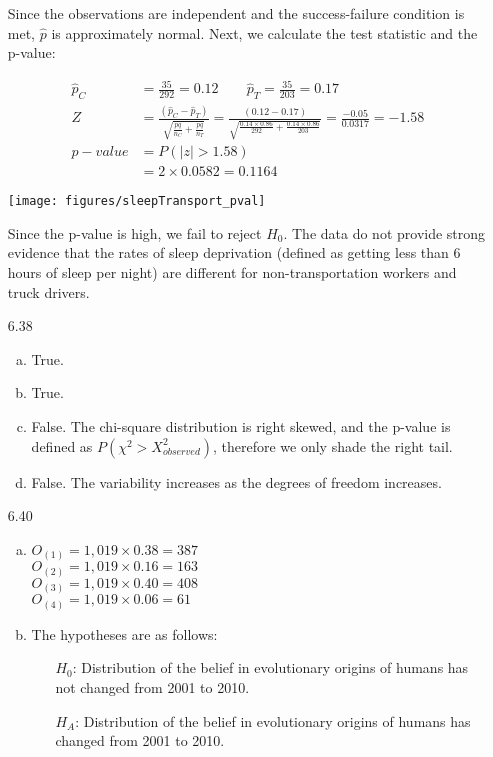 \documentclass[11pt]{article}
\begin{document}
\begin{enumerate}
Since the observations are independent and the success-failure condition is met, $\hat{p}$ is approximately normal. Next, we calculate the test statistic and the p-value:

\begin{minipage}{0.6\textwidth}
\begin{align*}
\hat{p}_C &= \frac{35}{292} = 0.12 \qquad \hat{p}_T = \frac{35}{203} = 0.17 \\
Z &= \frac{(\hat{p}_C - \hat{p}_T)}{\sqrt{\frac{\hat{p} \hat{q}}{n_C} + \frac{\hat{p} \hat{q}}{n_T}}} = \frac{(0.12 - 0.17)}{\sqrt{\frac{0.14 \times  0.86}{292} + \frac{0.14 \times  0.86}{203}}} = \frac{-0.05}{0.0317} = -1.58 \\
p-value &= P(|z| > 1.58) \\
&= 2 \times 0.0582 = 0.1164 
\end{align*}
\end{minipage}
\begin{minipage}{0.4\textwidth}
\texttt{[image: figures/sleepTransport\_pval]}
\end{minipage}

Since the p-value is high, we fail to reject $H_0$. The data do not provide strong evidence that the rates of sleep deprivation (defined as getting less than 6 hours of sleep per night) are different for non-transportation workers and truck drivers.

%

\item[6.38]
\begin{enumerate}[(a)]
\item True.
\item True.
\item False. The chi-square distribution is right skewed, and the p-value is defined as $P(\chi^2 > X^2_{observed})$, therefore we only shade the right tail.
\item False. The variability increases as the degrees of freedom increases.
\end{enumerate}

%

\item[6.40]
\begin{enumerate}[(a)]
\item $O_{(1)} = 1,019 \times  0.38 = 387$ \\
$O_{(2)} = 1,019 \times  0.16 = 163$ \\
$O_{(3)} = 1,019 \times  0.40= 408$ \\
$O_{(4)} = 1,019 \times  0.06 = 61$
\item The hypotheses are as follows:
\begin{itemize}
\item[] $H_0$: Distribution of the belief in evolutionary origins of humans has not changed from 2001 to 2010.
\item[] $H_A$: Distribution of the belief in evolutionary origins of humans has changed from 2001 to 2010.
\end{itemize}


\end{enumerate}
\end{enumerate}
\end{document}
